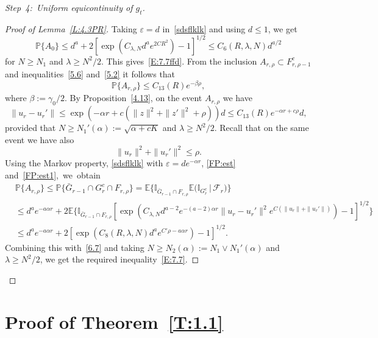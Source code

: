 \documentclass[10pt]{amsart}
\theoremstyle{definition}\newtheorem{defi}[theo]{Definition}\newtheorem{rema}[theo]{Remark}\newtheorem{exam}[theo]{Example}\newtheorem{exem}[theo]{Example}\newtheorem{nota}[theo]{Notation}
\newcommand{\e}{\varepsilon}
\newcommand{\IP}{{\mathbb P}}
\newcommand{\pP}{{\mathbb P}}
\newcommand{\I}{{\mathbb I}}
\newcommand{\E}{{\mathbb E}}
\newcommand{\FF}{{\mathcal F}}
\newcommand{\la}{\lambda}
\newenvironment{step}{\begin{proof}}{\let\qed\relax \end{proof}}
\begin{document}
\begin{step}[Step~4:~Uniform equicontinuity of $g_t$]
\begin{proof}[Proof of Lemma~\ref{L:4.3PR}]
Taking $\e=d$ in~\eqref{sdsflklk} and using $d\le1$, we get
\[
\IP\bigl\{ A_0 \bigr\}
\le d^a+2\left[\exp\left(C_{\la, N} d^{a} e^{ {2C R^2}} \right)-1\right]^{1/2}\le C_6(R,\la, N)d^{a/2}
\]
for $N \ge N_1$ and $\la\ge N^2/2 $.
This gives~\eqref{E:7.7ffd}. From the inclusion $A_{r,\rho}\subset F_{r,\rho-1}^c$ and inequalities~\eqref{5.6} and~\eqref{5.2} it follows that
\begin{equation}\label{6.7}
\pP\{A_{r,\rho}\}\le C_{13}(R) e^{-\beta\rho},
\end{equation}
where $ \beta:= \gamma_0/2$. By Proposition~\ref{4.13}, on the event $A_{r,\rho}$ we have
\begin{equation}
\|u_{r}-u_{r}'\|
\le \exp(-\alpha r + c(\| z\|^2 +\|z'\|^2+\rho))d\le C_{13}(R) e^{-\alpha r +c\rho}d, \label{FP:est}
\end{equation}
provided that $N\ge N_1'(\alpha):=\sqrt{\alpha +cK} $ and $\la\ge N^2/2 $. Recall that on the same event we have also
\begin{equation}\label{FP:est1}
\| u_r\|^2 +\|u_r'\|^2\le \rho.
\end{equation}
Using the Markov property, \eqref{sdsflklk} with $\e=de^{-\alpha r}$, \eqref{FP:est} and~\eqref{FP:est1},~we~obtain
\begin{align*}
&\IP\{A_{r,\rho}\}\le\IP\bigl\{\bar G_{r-1} \cap G_r^c \cap F_{r,\rho}\bigr\} =\E\bigl\{\I_{\bar G_{r-1}\cap F_{r,\rho}}\E\bigl(\I_{G_r^c}\,\big|\,\FF_{r}\bigr)\bigr\}\\
&\le d^ae^{-a\alpha r} +2\E\Big\{\I_{\bar G_{r-1}\cap F_{r,\rho}}\!\! \left[\exp\left(C_{\la,N} d^{a-2} e^{-(a-2)\alpha r}\|u_r\!-\!u_r'\|^2 e^{C(\| u_r\|+\|u_r'\|)} \right)-1\right]^{1/2}\!\Big\}\\
&\le d^ae^{-a\alpha r}+2\left[\exp\left(C_8(R,\la,N)d^a e^{C'\rho-a\alpha r} \right)-1\right]^{1/2}.
\end{align*}
Combining this with~\eqref{6.7} and taking $N\ge N_2(\alpha):=N_1\vee N_1'(\alpha) $ and $\la\ge N^2/2 $, we get the required inequality~\eqref{E:7.7}.
\end{proof}
\end{step}


\section{Proof of Theorem~\ref{T:1.1}}\label{S:3Sd}
\end{document}
